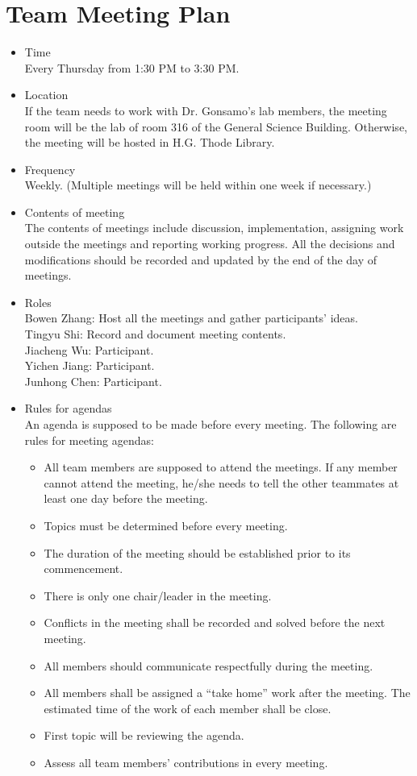 \documentclass{article}
\begin{document}
\section{Team Meeting Plan}
\begin{itemize}
    \item Time\\ Every Thursday from 1:30 PM to 3:30 PM.
    \item Location \\ If the team needs to work with Dr. Gonsamo's lab members, the meeting room
    will be the lab of room 316 of the General Science Building. Otherwise, the meeting will be hosted in H.G. Thode Library.
    \item Frequency \\ Weekly. (Multiple meetings will be held within one week if necessary.)
    \item Contents of meeting\\
    The contents of meetings include discussion, implementation, assigning work outside 
    the meetings and reporting working progress. All the decisions and modifications
    should be recorded and updated by the end of the day of meetings.
    \item Roles\\ 
    Bowen Zhang: Host all the meetings and gather participants' ideas.\\
    Tingyu Shi: Record and document meeting contents.\\
    Jiacheng Wu: Participant.\\
    Yichen Jiang: Participant.\\
    Junhong Chen: Participant.
    \item Rules for agendas\\
    An agenda is supposed to be made before every meeting. The following are rules for
    meeting agendas:
    \begin{itemize}
    \item All team members are supposed to attend the meetings. If any member cannot attend the meeting, he/she needs to tell the other teammates at least one day before the meeting.
    \item Topics must be determined before every meeting.
    \item The duration of the meeting should be established prior to its commencement.
    \item There is only one chair/leader in the meeting.
    \item Conflicts in the meeting shall be recorded and solved before the next meeting.
    \item All members should communicate respectfully during the meeting.
    \item All members shall be assigned a “take home” work after the meeting. The estimated time of the work of each member shall be close.
    \item First topic will be reviewing the agenda.
    \item Assess all team members’ contributions in every meeting.
    \end{itemize}
\end{itemize}
\end{document}
